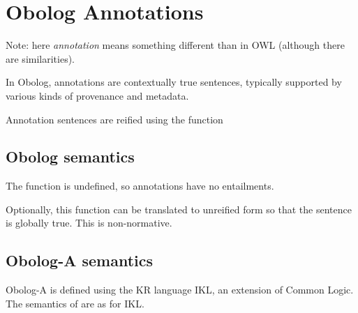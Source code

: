 \section{Obolog Annotations}

Note: here \emph{annotation} means something different than in OWL (although there are similarities).

In Obolog, annotations are contextually true sentences, typically
supported by various kinds of provenance and metadata.

Annotation sentences are reified using the function 

\subsection{Obolog semantics}

The function  is undefined, so annotations have no entailments.

Optionally, this function can be translated to unreified form so that
the sentence is globally true. This is non-normative.

\subsection{Obolog-A semantics}

Obolog-A is defined using the KR language IKL, an extension of Common
Logic. The semantics of  are as for IKL.




